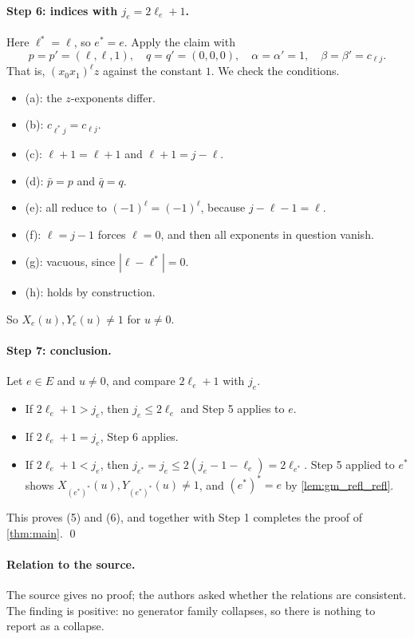 \documentclass[11pt]{article}
\theoremstyle{definition}
\theoremstyle{remark}
\begin{document}
\paragraph{Step 6: indices with $j_e=2\ell_e+1$.}
Here $\ell^\ast=\ell$, so $e^\ast=e$. Apply the claim with
\[
p=p'=(\ell,\ell,1),\quad q=q'=(0,0,0),\quad \alpha=\alpha'=1,\quad \beta=\beta'=c_{\ell j}.
\]
That is, $(x_0x_1)^\ell z$ against the constant $1$. We check the conditions.
\begin{itemize}
\item (a): the $z$-exponents differ.
\item (b): $c_{\ell^\ast j}=c_{\ell j}$.
\item (c): $\ell+1=\ell+1$ and $\ell+1=j-\ell$.
\item (d): $\bar p=p$ and $\bar q=q$.
\item (e): all reduce to $(-1)^\ell=(-1)^\ell$, because $j-\ell-1=\ell$.
\item (f): $\ell=j-1$ forces $\ell=0$, and then all exponents in question vanish.
\item (g): vacuous, since $|\ell-\ell^\ast|=0$.
\item (h): holds by construction.
\end{itemize}
So $X_e(u),Y_e(u)\ne1$ for $u\neq0$.

\paragraph{Step 7: conclusion.}
Let $e\in E$ and $u\neq0$, and compare $2\ell_e+1$ with $j_e$.
\begin{itemize}
\item If $2\ell_e+1>j_e$, then $j_e\le2\ell_e$ and Step 5 applies to $e$.
\item If $2\ell_e+1=j_e$, Step 6 applies.
\item If $2\ell_e+1<j_e$, then $j_{e^\ast}=j_e\le2(j_e-1-\ell_e)=2\ell_{e^\ast}$. Step 5 applied to $e^\ast$ shows $X_{(e^\ast)^\ast}(u),Y_{(e^\ast)^\ast}(u)\ne1$, and $(e^\ast)^\ast=e$ by \cref{lem:gm_refl_refl}.
\end{itemize}
This proves (5) and (6), and together with Step 1 completes the proof of \cref{thm:main}. \qed

\paragraph{Relation to the source.}
The source gives no proof; the authors asked whether the relations are consistent. The finding is positive: no generator family collapses, so there is nothing to report as a collapse.
\end{document}
